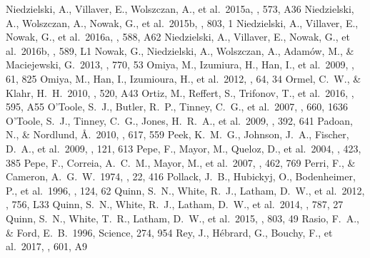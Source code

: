 \documentclass[twocolumn]{aastex62}
\begin{document}
\begin{CJK*}{UTF8}{min}
\begin{thebibliography}{}
 Niedzielski, A., Villaver, E., Wolszczan, A., et al.\ 2015a, \aap, 573, A36
 Niedzielski, A., Wolszczan, A., Nowak, G., et al.\ 2015b, \apj, 803, 1
 Niedzielski, A., Villaver, E., Nowak, G., et al.\ 2016a, \aap, 588, A62
 Niedzielski, A., Villaver, E., Nowak, G., et al.\ 2016b, \aap, 589, L1
 Nowak, G., Niedzielski, A., Wolszczan, A., Adam{\'o}w, M., \& Maciejewski, G.\ 2013, \apj, 770, 53
 Omiya, M., Izumiura, H., Han, I., et al.\ 2009, \pasj, 61, 825
 Omiya, M., Han, I., Izumioura, H., et al.\ 2012, \pasj, 64, 34
 Ormel, C.~W., \& Klahr, H.~H.\ 2010, \aap, 520, A43
 Ortiz, M., Reffert, S., Trifonov, T., et al.\ 2016, \aap, 595, A55
 O'Toole, S.~J., Butler, R.~P., Tinney, C.~G., et al.\ 2007, \apj, 660, 1636
 O'Toole, S.~J., Tinney, C.~G., Jones, H.~R.~A., et al.\ 2009, \mnras, 392, 641
 Padoan, N., \& Nordlund, \AA.\ 2010, \apj, 617, 559
 Peek, K.~M.~G., Johnson, J.~A., Fischer, D.~A., et al.\ 2009, \pasp, 121, 613
 Pepe, F., Mayor, M., Queloz, D., et al.\ 2004, \aap, 423, 385
 Pepe, F., Correia, A.~C.~M., Mayor, M., et al.\ 2007, \aap, 462, 769
 Perri, F., \& Cameron, A.~G.~W.\ 1974, \icarus, 22, 416
 Pollack, J.~B., Hubickyj, O., Bodenheimer, P., et al.\ 1996, \icarus, 124, 62
 Quinn, S.~N., White, R.~J., Latham, D.~W., et al.\ 2012, \apjl, 756, L33
 Quinn, S.~N., White, R.~J., Latham, D.~W., et al.\ 2014, \apj, 787, 27
 Quinn, S.~N., White, T.~R., Latham, D.~W., et al.\ 2015, \apj, 803, 49
 Rasio, F.~A., \& Ford, E.~B.\ 1996, Science, 274, 954
 Rey, J., H{\'e}brard, G., Bouchy, F., et al.\ 2017, \aap, 601, A9

\end{thebibliography}
\end{CJK*}
\end{document}

